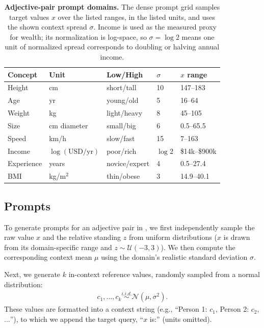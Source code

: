 \documentclass{article}
\begin{document}
\begin{table}[t]
  \centering
  \small
  \setlength{\tabcolsep}{3pt}
  \caption{\textbf{Adjective-pair prompt domains.}
  The dense prompt grid samples target values $x$ over the listed ranges, in the listed units, and uses the shown context spread $\sigma$.
  Income is used as the measured proxy for wealth; its normalization is log-space, so $\sigma=\log 2$ means one unit of normalized spread corresponds to doubling or halving annual income.}
  \label{tab:domains}
  \begin{tabular}{lllll}
    \toprule
    Concept & Unit & Low/High & $\sigma$ & $x$ range \\
    \midrule
    Height & cm & short/tall & 10 & 147--183 \\
    Age & yr & young/old & 5 & 16--64 \\
    Weight & kg & light/heavy & 8 & 45--105 \\
    Size & cm diameter & small/big & 6 & 0.5--65.5 \\
    Speed & km/h & slow/fast & 15 & 7--163 \\
    Income & $\log(\mathrm{USD/yr})$ & poor/rich & $\log 2$ & \$14k--\$900k \\
    Experience & years & novice/expert & 4 & 0.5--27.4 \\
    BMI & kg/m$^2$ & thin/obese & 3 & 14.9--40.1 \\
    \bottomrule
  \end{tabular}
\end{table}

\subsection{Prompts}
\label{subsec:prompts}
To generate prompts for an adjective pair in , we first independently sample the raw value $x$ and the relative standing $z$ from uniform distributions ($x$ is drawn from its domain-specific range and $z \sim \mathcal{U}(-3, 3)$). We then compute the corresponding context mean $\mu$ using the domain's realistic standard deviation $\sigma$.

Next, we generate $k$ in-context reference values, randomly sampled from a normal distribution:
\begin{align*}
    c_1,\ldots,c_k \overset{i.i.d.}{\sim} \mathcal{N}(\mu,\sigma^2).
\end{align*}
These values are formatted into a context string (e.g., ``Person 1: $c_1$, Person 2: $c_2$, $\dots$''), to which we append the target query, ``$x$ is:'' (units omitted).
\end{document}
